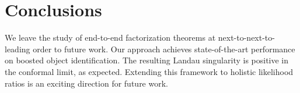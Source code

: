 \section{Conclusions}\label{sec:conclusions}

We leave the study of end-to-end factorization theorems at
next-to-next-to-leading order to future work. Our approach achieves
state-of-the-art performance on boosted object identification. The
resulting Landau singularity is positive in the conformal limit, as
expected. Extending this framework to holistic likelihood ratios is an
exciting direction for future work.

